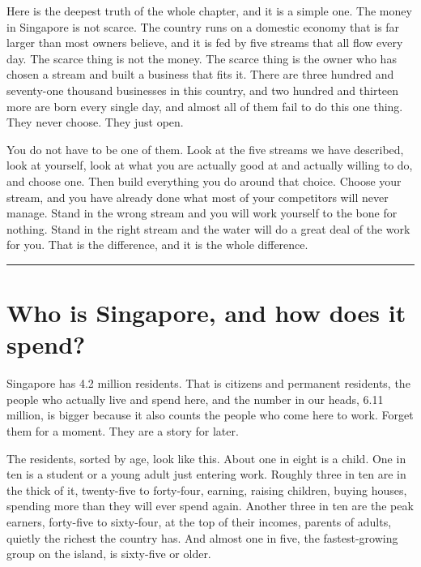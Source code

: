 \documentclass[10pt,twoside,openany]{memoir}
\begin{document}
{{{{{{{{{{{{{{Here is the deepest truth of the whole chapter, and it is a simple one.
The money in Singapore is not scarce. The country runs on a domestic
economy that is far larger than most owners believe, and it is fed by
five streams that all flow every day. The scarce thing is not the money.
The scarce thing is the owner who has chosen a stream and built a
business that fits it. There are three hundred and seventy-one thousand
businesses in this country, and two hundred and thirteen more are born
every single day, and almost all of them fail to do this one thing. They
never choose. They just open.

You do not have to be one of them. Look at the five streams we have
described, look at yourself, look at what you are actually good at and
actually willing to do, and choose one. Then build everything you do
around that choice. Choose your stream, and you have already done what
most of your competitors will never manage. Stand in the wrong stream
and you will work yourself to the bone for nothing. Stand in the right
stream and the water will do a great deal of the work for you. That is
the difference, and it is the whole difference.

\begin{center}\rule{0.5\linewidth}{0.5pt}\end{center}

\FloatBarrier
\chapter{Who is Singapore, and how does it
spend?}\label{who-is-singapore-and-how-does-it-spend}

Singapore has 4.2 million residents. That is citizens and permanent
residents, the people who actually live and spend here, and the number
in our heads, 6.11 million, is bigger because it also counts the people
who come here to work. Forget them for a moment. They are a story for
later.

The residents, sorted by age, look like this. About one in eight is a
child. One in ten is a student or a young adult just entering work.
Roughly three in ten are in the thick of it, twenty-five to forty-four,
earning, raising children, buying houses, spending more than they will
ever spend again. Another three in ten are the peak earners, forty-five
to sixty-four, at the top of their incomes, parents of adults, quietly
the richest the country has. And almost one in five, the fastest-growing
group on the island, is sixty-five or older.

}}}}}}}}}}}}}}
\end{document}
